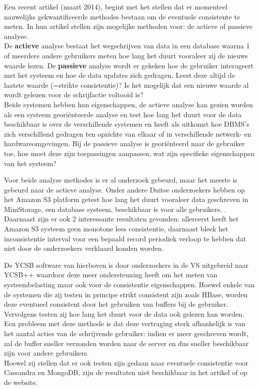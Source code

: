 Een recent artikel \cite{golab2014eventually} (maart 2014), begint met het stellen dat er momenteel nauwelijks gekwantificeerde methodes bestaan om de eventuele consistente te meten. In hun artikel stellen zijn mogelijke methoden voor: de actieve of passieve analyse. \\
De \textbf{actieve} analyse bestaat het wegschrijven van data in een database waarna 1 of meerdere andere gebruikers meten hoe lang het duurt vooraleer zij de nieuwe waarde lezen. 
De \textbf{passieve} analyse wordt er gekeken hoe de gebruiker interageert met het systeem en hoe de data updates zich gedragen. Leest deze altijd de laatste waarde (=strikte consistentie)? Is het mogelijk dat een nieuwe waarde al wordt gelezen voor de schrijfactie voltooid is? \\
Beide systemen hebben hun eigenschappen, de actieve analyse kan gezien worden als een systeem georiënteerde analyse en test hoe lang het duurt voor de data beschikbaar is over de verschillende systemen en heeft als uitkomst hoe DBMS's zich verschillend gedragen ten opzichte van elkaar of in verschillende netwerk- en hardwareomgevingen. 
Bij de passieve analyse is georiënteerd naar de gebruiker toe, hoe moet deze zijn toepassingen aanpassen, wat zijn specifieke eigenschappen van het systeem? 

Voor beide analyse methodes is er al onderzoek gebeurd, maar het meeste is gebeurd naar de actieve analyse. Onder andere Duitse onderzoekers hebben op het Amazon S3 platform getest hoe lang het duurt vooraleer data geschreven in MiniStorage, een database systeem, beschikbaar is voor alle gebruikers. \cite{bermbach2011eventual}. \\
Daarnaast zijn er ook 2 interessante resultaten gevonden: allereerst heeft het Amazon S3 systeem geen monotone lees consistentie, daarnaast bleek het inconsistentie interval voor een bepaald record periodiek verloop te hebben dat niet door de onderzoekers verklaard konden worden. 

De YCSB software van hierboven is door onderzoekers in de VS uitgebreid naar YCSB++\cite{patil2011ycsb++} waardoor deze meer ondersteuning heeft om het meten van systeembelasting maar ook voor de consistentie eigenschappen. Hoewel enkele van de systemen die zij testen in principe strikt consistent zijn zoals HBase, worden deze eventueel consistent door het gebruiken van buffers bij de gebruiker. Vervolgens testen zij hoe lang het duurt voor de data ook gelezen kan worden. Een probleem met deze methode is dat deze vertraging sterk afhankelijk is van het aantal acties van de schrijvende gebruiker: indien er meer geschreven wordt, zal de buffer sneller verzonden worden naar de server en dus sneller beschikbaar zijn voor andere gebruikers. \\
Hoewel zij stellen dat er ook testen zijn gedaan naar eventuele consistentie voor Cassandra en MongoDB, zijn de resultaten niet beschikbaar in het artikel of op de website. 

